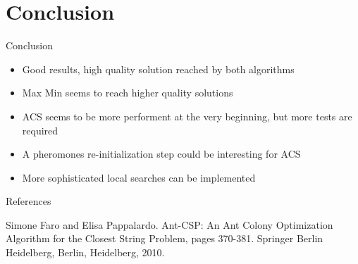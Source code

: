 \documentclass{beamer}
\begin{document}
\section{Conclusion}

\begin{frame}{Conclusion}
    \begin{itemize}
        \item Good results, high quality solution reached by both algorithms
        \item Max Min seems to reach higher quality solutions
        \item ACS seems to be more performent at the very beginning, but more tests are required
        \item A pheromones re-initialization step could be interesting for ACS
        \item More sophisticated local searches can be implemented
    \end{itemize}
\end{frame}

\begin{frame}{References}


    \begin{thebibliography}{1}

         Simone Faro and Elisa Pappalardo.
        Ant-CSP: An Ant Colony Optimization Algorithm for the Closest String Problem, pages 370-381.
        Springer Berlin
        Heidelberg, Berlin, Heidelberg, 2010.

    \end{thebibliography}

\end{frame}
\end{document}
